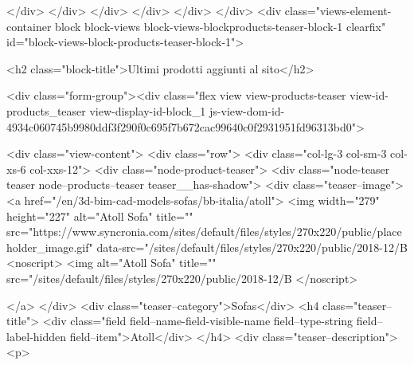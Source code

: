 					</div>
				</div>
			</div>
		</div>
	</div>
</div>
<div class="views-element-container block block-views block-views-blockproducts-teaser-block-1 clearfix" id="block-views-block-products-teaser-block-1">
  
      <h2 class="block-title">Ultimi prodotti aggiunti al sito</h2>
    

      

<div class="form-group"><div class="flex view view-products-teaser view-id-products_teaser view-display-id-block_1 js-view-dom-id-4934c060745b9980ddf3f290f0c695f7b672cac99640c0f2931951fd96313bd0">
  
    
      
      <div class="view-content">
      <div class="row">
            <div  class="col-lg-3 col-sm-3 col-xs-6 col-xxs-12">
          <div class="node-product-teaser">
          <div class="node-teaser teaser node--products--teaser teaser__has-shadow">
	<div class="teaser--image">
		<a href="/en/3d-bim-cad-models-sofas/bb-italia/atoll">
			<img width="279" height="227" alt="Atoll Sofa" title="" src="https://www.syncronia.com/sites/default/files/styles/270x220/public/placeholder_image.gif" data-src="/sites/default/files/styles/270x220/public/2018-12/B%
            <noscript>
                <img alt="Atoll Sofa" title="" src="/sites/default/files/styles/270x220/public/2018-12/B%
            </noscript>
			
		</a> 
	</div>
	<div class="teaser--category">Sofas</div>
	<h4 class="teaser--title">
            <div class="field field--name-field-visible-name field--type-string field--label-hidden field--item">Atoll</div>
      </h4>
	<div  class="teaser--description">
	<p>
				
